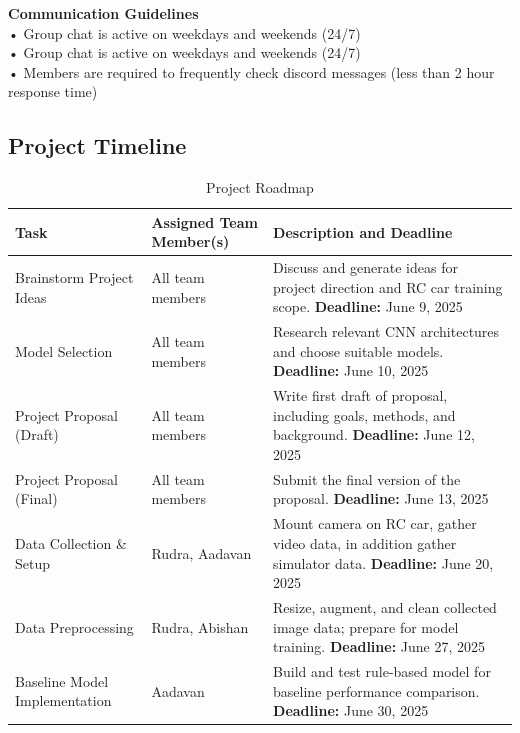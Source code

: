 \documentclass{article} %
\begin{document}
\textbf{Communication Guidelines}
\\• Group chat is active on weekdays and weekends (24/7)
\\• Group chat is active on weekdays and weekends (24/7)
\\• Members are required to frequently check discord messages (less than 2 hour response time)




\subsection{Project Timeline}
\begin{table}[H]
\caption{Project Roadmap}
\centering
\begin{tabular}{|p{4.5cm}|p{3.5cm}|p{6cm}|}
\hline
\textbf{Task} & \textbf{Assigned Team Member(s)} & \textbf{Description and Deadline} \\ \hline
Brainstorm Project Ideas & All team members & Discuss and generate ideas for project direction and RC car training scope. \newline \textbf{Deadline:} June 9, 2025 \\ \hline
Model Selection & All team members & Research relevant CNN architectures and choose suitable models. \newline \textbf{Deadline:} June 10, 2025 \\ \hline
Project Proposal (Draft) & All team members & Write first draft of proposal, including goals, methods, and background. \newline \textbf{Deadline:} June 12, 2025 \\ \hline
Project Proposal (Final) & All team members & Submit the final version of the proposal. \newline \textbf{Deadline:} June 13, 2025 \\ \hline
Data Collection \& Setup & Rudra, Aadavan & Mount camera on RC car, gather video data, in addition gather simulator data. \newline \textbf{Deadline:} June 20, 2025 \\ \hline
Data Preprocessing & Rudra, Abishan & Resize, augment, and clean collected image data; prepare for model training. \newline \textbf{Deadline:} June 27, 2025 \\ \hline
Baseline Model Implementation & Aadavan & Build and test rule-based model for baseline performance comparison. \newline \textbf{Deadline:} June 30, 2025 \\ \hline

\end{tabular}
\end{table}
\end{document}
